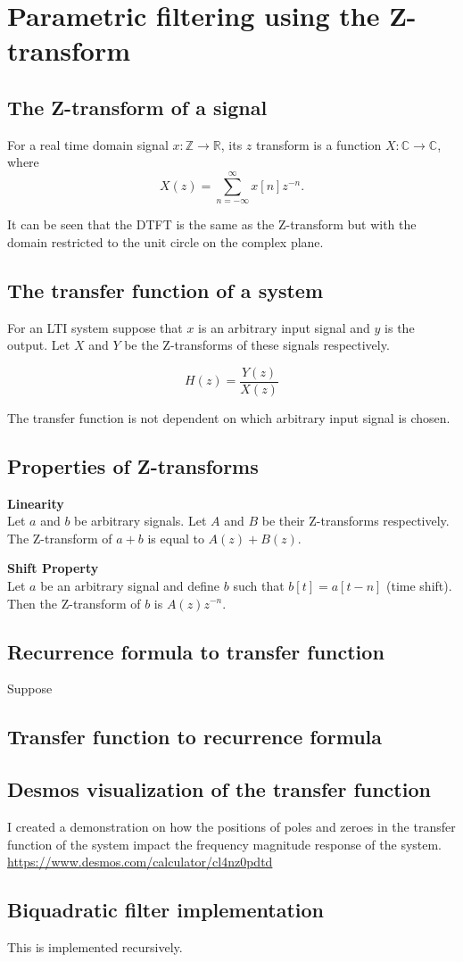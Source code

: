 \section{Parametric filtering using the Z-transform}
\subsection{The Z-transform of a signal}
For a real time domain signal $x:\mathbb{Z}\to\mathbb{R}$, its $z$ transform is a function $X:\mathbb{C}\to\mathbb{C}$, where
$$X(z)=\sum_{n=-\infty}^{\infty}x[n]z^{-n}.$$

It can be seen that the DTFT is the same as the Z-transform but with the domain restricted to the 
unit circle on the complex plane.

\subsection{The transfer function of a system}
For an LTI system suppose that $x$ is an arbitrary input signal and $y$ is the output.
Let $X$ and $Y$ be the Z-transforms of these signals respectively.

$$H(z)=\frac{Y(z)}{X(z)}$$

The transfer function is not dependent on which arbitrary input signal is chosen.

\subsection{Properties of Z-transforms}
\textbf{Linearity}\\
Let $a$ and $b$ be arbitrary signals. Let $A$ and $B$ be their Z-transforms respectively.
The Z-transform of $a+b$ is equal to $A(z) + B(z)$.

\textbf{Shift Property}\\
Let $a$ be an arbitrary signal and define $b$ such that $b[t] = a[t-n]$ (time shift).
Then the Z-transform of $b$ is $A(z)z^{-n}$.

\subsection{Recurrence formula to transfer function}
Suppose 

\subsection{Transfer function to recurrence formula}

\subsection{Desmos visualization of the transfer function}
I created a demonstration on how the positions of poles and zeroes in the 
transfer function of the system impact the frequency magnitude response of the system.
\href{https://www.desmos.com/calculator/cl4nz0pdtd}{https://www.desmos.com/calculator/cl4nz0pdtd}

\subsection{Biquadratic filter implementation}
This is implemented recursively.